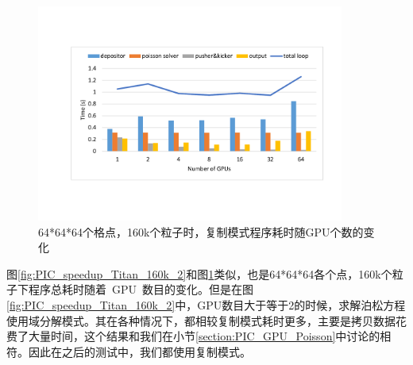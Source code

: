 \begin{figure}[!htb]
  \centering
  \includegraphics[width=0.9\textwidth]{Img/PIC_speedup_Titan_160k_1.pdf}
  \caption{64*64*64个格点，160k个粒子时，复制模式程序耗时随GPU个数的变化}
  \label{fig:PIC_speedup_Titan_160k_1}
\end{figure}

图\ref{fig:PIC_speedup_Titan_160k_2}和图\ref{fig:PIC_speedup_Titan_160k_1}类似，也是64*64*64各个点，160k个粒子下程序总耗时随着~GPU~数目的变化。但是在图\ref{fig:PIC_speedup_Titan_160k_2}中，GPU数目大于等于2的时候，求解泊松方程使用域分解模式。其在各种情况下，都相较复制模式耗时更多，主要是拷贝数据花费了大量时间，这个结果和我们在小节\ref{section:PIC_GPU_Poisson}中讨论的相符。因此在之后的测试中，我们都使用复制模式。

